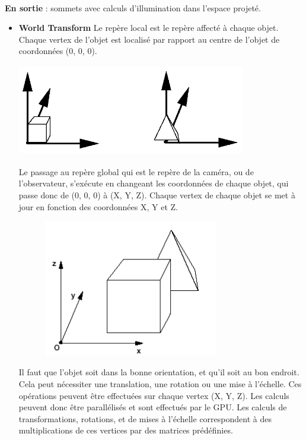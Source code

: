 \textbf{\\En sortie} : sommets avec calculs d’illumination dans l’espace projeté.\\
\begin{itemize}
  \item{\textbf{World Transform}}
Le repère local est le repère affecté à chaque objet. Chaque vertex de l’objet est localisé par rapport au centre de l’objet de coordonnées (0, 0, 0).
\\
\begin{center}
\includegraphics[width=10cm,height=40mm]{pipeline/images/repereLocal.png}
\end{center}

Le passage au repère global qui est le repère de la caméra, ou de l’observateur, s’exécute en changeant les coordonnées de chaque objet, qui passe donc de (0, 0, 0) à (X, Y, Z). Chaque vertex de chaque objet se met à jour en fonction des coordonnées X, Y et Z.
\\
\begin{center}
\includegraphics[width=10cm,height=60mm]{pipeline/images/repereGlobal.png}\\
\end{center}

Il faut que l’objet soit dans la bonne orientation, et qu’il soit au bon endroit. Cela peut nécessiter une translation, une rotation ou une mise à l’échelle. Ces opérations peuvent être effectuées sur chaque vertex (X, Y, Z). Les calculs peuvent donc être parallélisés et sont effectués par le GPU. Les calculs de transformations, rotations, et de mises à l’échelle correspondent à des multiplications de ces vertices par des matrices prédéfinies.



\end{itemize}

